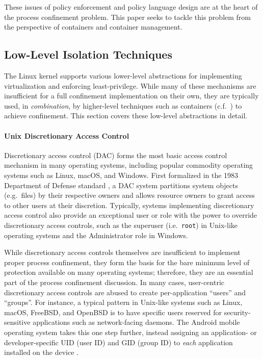 These issues of policy enforcement and policy language design are at the heart of the process confinement problem. This paper seeks to tackle this problem from the perspective of containers and container management.

\subsection{Low-Level Isolation Techniques}
\label{subsection:low_level}

The Linux kernel supports various lower-level abstractions for implementing virtualization and enforcing least-privilege. While many of these mechanisms are insufficient for a full confinement implementation on their own, they are typically used, in \textit{combination}, by higher-level techniques such as containers (c.f.~) to achieve confinement. This section covers these low-level abstractions in detail.


\paragraph*{Unix Discretionary Access Control}

Discretionary access control (DAC) forms the most basic access control mechanism in many operating systems, including popular commodity operating systems such as Linux, macOS, and Windows.  First formalized in the 1983 Department of Defense standard \cite{orange_book}, a DAC system partitions system objects (e.g.~files) by their respective owners and allows resource owners to grant access to other users at their discretion.  Typically, systems implementing discretionary access control also provide an exceptional user or role with the power to override discretionary access controls, such as the superuser (i.e.~\texttt{root}) in Unix-like operating systems and the Administrator role in Windows.

While discretionary access controls themselves are insufficient to implement proper process confinement, they form the basis for the bare minimum level of protection available on many operating systems; therefore, they are an essential part of the process confinement discussion. In many cases, user-centric discretionary access controls are abused to create per-application \enquote{users} and \enquote{groups}. For instance, a typical pattern in Unix-like systems such as Linux, macOS, FreeBSD, and OpenBSD is to have specific users reserved for security-sensitive applications such as network-facing daemons. The Android mobile operating system takes this one step further, instead assigning an application- or developer-specific UID (user ID) and GID (group ID) to \textit{each} application installed on the device \cite{android_security}.

